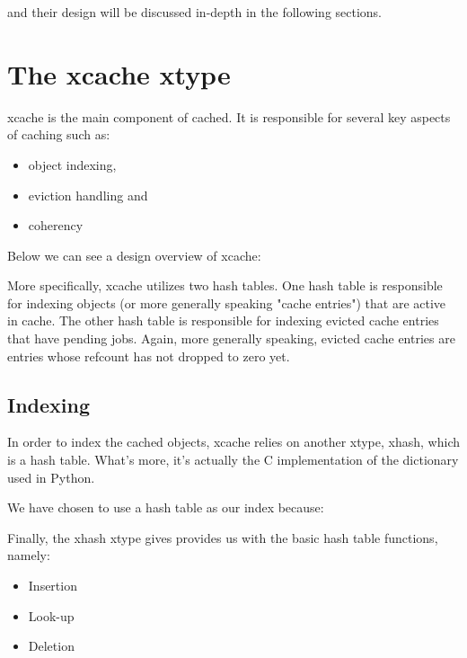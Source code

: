 and their design will be discussed in-depth in the following sections.

\section{The xcache xtype}

xcache is the main component of cached. It is responsible for several key 
aspects of caching such as:

\begin{itemize}
	\item object indexing,
	\item eviction handling and
	\item coherency
\end{itemize}

Below we can see a design overview of xcache:


More specifically, xcache utilizes two hash tables. One hash table is 
responsible for indexing objects (or more generally speaking "cache entries") 
that are active in cache.  The other hash table is responsible for indexing 
evicted cache entries that have pending jobs.  Again, more generally speaking, 
evicted cache entries are entries whose refcount has not dropped to zero yet.

\subsection{Indexing}

In order to index the cached objects, xcache relies on another xtype, xhash, 
which is a hash table. What's more, it's actually the C implementation of the 
dictionary used in Python.

We have chosen to use a hash table as our index because:


Finally, the xhash xtype gives provides us with the basic hash table functions, 
namely:

\begin{itemize}
	\item Insertion
	\item Look-up
	\item Deletion
\end{itemize}

